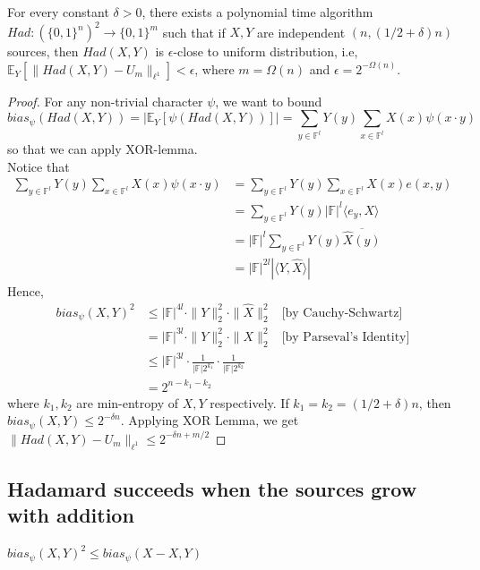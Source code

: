 \begin{theorem}
For every constant $\delta > 0$, there exists a polynomial time algorithm $Had: (\{ 0 , 1 \}^n)^2 \rightarrow \{ 0, 1 \}^m$ such that if $X, Y$ are independent $(n, (1/2 + \delta)n)$ sources, then $Had(X,Y)$ is $\epsilon$-close to uniform distribution, i.e, 
$\mathbb{E}_Y [ \| Had(X,Y) - U_m \|_{\ell ^1}] < \epsilon$, where $m = \Omega(n)$ and $\epsilon = 2^{-\Omega(n)}$.
\end{theorem}

\begin{proof}
For any non-trivial character $\psi$, we want to bound 
$$bias_\psi(Had(X,Y)) = | \mathbb{E}_Y [\psi(Had(X,Y))]| = 
\sum\limits_{y \in \mathbb{F}^l} Y(y) \sum\limits_{x \in \mathbb{F}^l} X(x) \psi(x \cdot y)$$
so that we can apply XOR-lemma.  \\
Notice that
\begin{align*} 
\sum\limits_{y \in \mathbb{F}^l} Y(y) \sum\limits_{x \in \mathbb{F}^l} X(x) \psi(x \cdot y)
&= \sum\limits_{y \in \mathbb{F}^l} Y(y) \sum\limits_{x \in \mathbb{F}^l} X(x) e(x,y) \\
&= \sum\limits_{y \in \mathbb{F}^l} Y(y) |\mathbb{F}|^l \langle e_y, X \rangle \\
&= |\mathbb{F}|^l \sum\limits_{y \in \mathbb{F}^l} Y(y) \overline{\widehat{X}(y)} \\
&= |\mathbb{F}|^{2l} |\langle Y, \widehat{X} \rangle |
\end{align*}
Hence, 
\begin{align*}
bias_\psi(X,Y)^2 
& \leq |\mathbb{F}|^{4l} \cdot \| Y \|_2^2 \cdot \| \widehat{X} \|_2^2 
	& \text{[by Cauchy-Schwartz]} \\
&  =   |\mathbb{F}|^{3l} \cdot \| Y \|_2^2 \cdot \| X \|_2^2          
    & \text{[by Parseval's Identity]} \\
& \leq |\mathbb{F}|^{3l} \cdot \frac{1}{|\mathbb{F}| 2^{k_1}} \cdot \frac{1}{|\mathbb{F}| 2^{k_2}} \\
&  = 2^{n - k_1 - k_2}
\end{align*}
where $k_1, k_2$ are min-entropy of $X,Y$ respectively. If $k_1 = k_2 = (1/2 + \delta)n$, then $bias_\psi(X,Y) \leq 2^{-\delta n}$. Applying XOR Lemma, we get $\| Had(X,Y) - U_m\|_{\ell^1} \leq 2^{-\delta n + m/2}$
\end{proof}

\subsection{Hadamard succeeds when the sources grow with addition}
\begin{lemma}
$bias_\psi(X,Y)^2 \leq bias_\psi(X - X, Y)$
\end{lemma}

